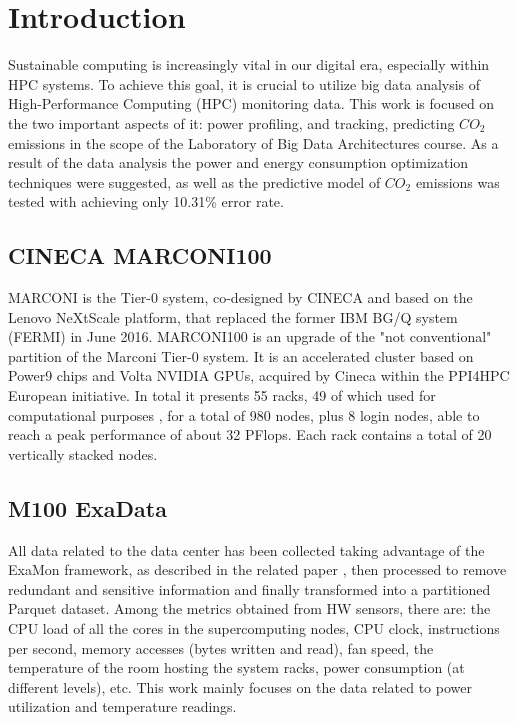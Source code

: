 \section{Introduction}
\noindent

Sustainable computing is increasingly vital in our digital era, especially within HPC systems.
To achieve this goal, it is crucial to utilize big data analysis of High-Performance Computing (HPC) monitoring data.
This work is focused on the two important aspects of it: power profiling, and tracking, predicting $CO_2$ emissions in the scope of the Laboratory of Big Data Architectures course.
As a result of the data analysis the power and energy consumption optimization techniques were suggested, as well as the predictive model of $CO_2$ emissions was tested with achieving only 10.31\% error rate.

\subsection{CINECA MARCONI100}
MARCONI is the Tier-0 system, co-designed by CINECA and based on the Lenovo NeXtScale platform, that replaced the former IBM BG/Q system (FERMI) in June 2016.
MARCONI100 is an upgrade of the "not conventional" partition of the Marconi Tier-0 system. It is an accelerated cluster based on Power9 chips and Volta NVIDIA GPUs, acquired by Cineca within the PPI4HPC European initiative.
In total it presents 55 racks, 49 of which used for computational purposes \cite{Marconi100Site}, for a total of 980 nodes, plus 8 login nodes, able to reach a peak performance of about 32 PFlops.
Each rack contains a total of 20 vertically stacked nodes.

\subsection{M100 ExaData}
All data related to the data center has been collected taking advantage of the ExaMon framework, as described in the related paper \cite{Marconi100}, then processed to remove redundant and sensitive information and finally transformed into a partitioned Parquet dataset.
Among the metrics obtained from HW sensors, there are: the CPU load of all the cores in the supercomputing nodes, CPU clock, instructions per second, memory accesses (bytes written and read), fan speed, the temperature of the room hosting the system racks, power consumption (at different levels), etc.
This work mainly focuses on the data related to power utilization and temperature readings.

